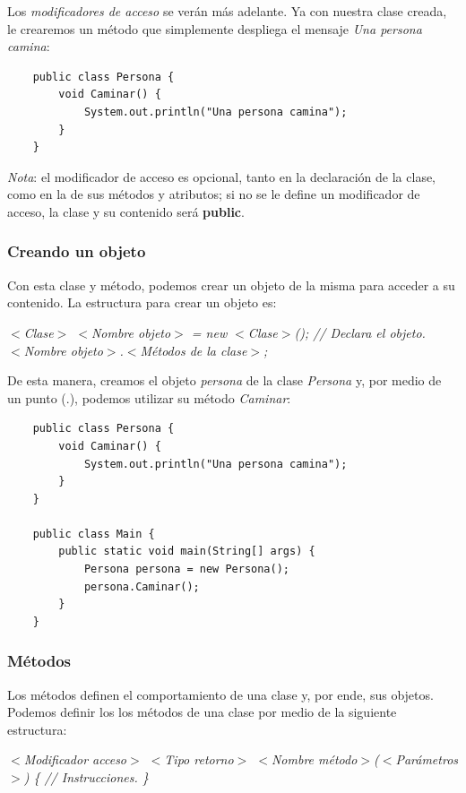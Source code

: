 Los \textit{modificadores de acceso} se verán más adelante. Ya con nuestra clase creada, le crearemos un método que simplemente despliega el mensaje \textit{Una persona camina}:
\begin{lstlisting}
    public class Persona {
        void Caminar() {
            System.out.println("Una persona camina");
        }
    }
\end{lstlisting}

\textit{Nota}: el modificador de acceso es opcional, tanto en la declaración de la clase, como en la de sus métodos y atributos; si no se le define un modificador de acceso, la clase y su contenido será \textbf{public}.


\subsubsection{Creando un objeto}
\hspace{0.55cm}Con esta clase y método, podemos crear un objeto de la misma para acceder a su contenido. La estructura para crear un objeto es:
\begin{center}
	\textit{
		$<$Clase$>$ $<$Nombre objeto$>$ = new $<$Clase$>$(); // Declara el objeto. \\
		$<$Nombre objeto$>$.$<$Métodos de la clase$>$;
	}
\end{center}

De esta manera, creamos el objeto \textit{persona} de la clase \textit{Persona} y, por medio de un punto (.), podemos utilizar su método \textit{Caminar}:
\begin{lstlisting}
    public class Persona {
        void Caminar() {
            System.out.println("Una persona camina");
        }
    }
    
    public class Main {
        public static void main(String[] args) {
            Persona persona = new Persona();
            persona.Caminar();
        }
    }
\end{lstlisting}


\subsubsection{Métodos}
\hspace{0.55cm}Los métodos definen el comportamiento de una clase y, por ende, sus objetos. Podemos definir los los métodos de una clase por medio de la siguiente estructura:
\begin{center}
	\textit{
		$<$Modificador acceso$>$ $<$Tipo retorno$>$ $<$Nombre método$>$($<$Parámetros$>$) \{ // Instrucciones. \}
	}
\end{center}

